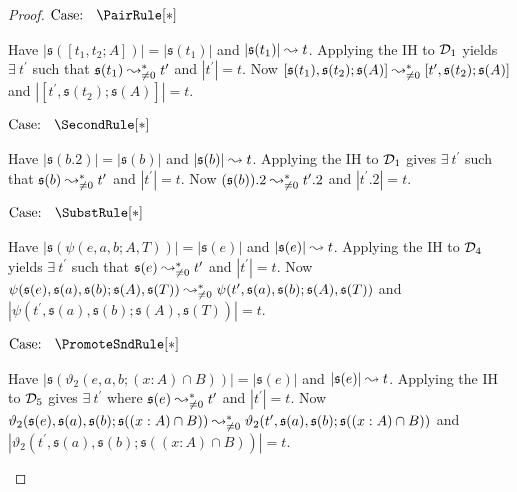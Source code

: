 \begin{proof}
    $\text{Case: }\begin{array}{c} \PairRule[*] \end{array}$
    \begin{proofcase}
        Have $|\mathfrak{s}([t_1, t_2; A])| = |\mathfrak{s}(t_1)|$ and $|\mathfrak{s}(t_1)| \leadsto t$.
        Applying the IH to $\mathcal{D}_{1}$ yields $\exists\ t^\prime$ such that $\mathfrak{s}(t_1) \leadsto^*_{\neq 0} t^\prime$ and $|t^\prime| = t$.
        Now $[\mathfrak{s}(t_1), \mathfrak{s}(t_2); \mathfrak{s}(A)] \leadsto^*_{\neq 0} [t^\prime, \mathfrak{s}(t_2); \mathfrak{s}(A)]$ and $|[t^\prime, \mathfrak{s}(t_2); \mathfrak{s}(A)]| = t$.
    \end{proofcase}

    $\text{Case: }\begin{array}{c} \SecondRule[*] \end{array}$
    \begin{proofcase}
        Have $|\mathfrak{s}(b.2)| = |\mathfrak{s}(b)|$ and $|\mathfrak{s}(b)| \leadsto t$.
        Applying the IH to $\mathcal{D}_{1}$ gives $\exists\ t^\prime$ such that $\mathfrak{s}(b) \leadsto^*_{\neq 0} t^\prime$ and $|t^\prime| = t$.
        Now $(\mathfrak{s}(b)).2 \leadsto^*_{\neq 0} t^\prime.2$ and $|t^\prime.2| = t$.
    \end{proofcase}

    $\text{Case: }\begin{array}{c} \SubstRule[*] \end{array}$
    \begin{proofcase}
        Have $|\mathfrak{s}(\psi(e, a, b; A, T))| = |\mathfrak{s}(e)|$ and $|\mathfrak{s}(e)| \leadsto t$.
        Applying the IH to $\mathcal{D}_{4}$ yields $\exists\ t^\prime$ such that $\mathfrak{s}(e) \leadsto^*_{\neq 0} t^\prime$ and $|t^\prime| = t$.
        Now $\psi(\mathfrak{s}(e), \mathfrak{s}(a), \mathfrak{s}(b); \mathfrak{s}(A), \mathfrak{s}(T)) \leadsto^*_{\neq 0} \psi(t^\prime, \mathfrak{s}(a), \mathfrak{s}(b); \mathfrak{s}(A), \mathfrak{s}(T))$
            and $|\psi(t^\prime, \mathfrak{s}(a), \mathfrak{s}(b); \mathfrak{s}(A), \mathfrak{s}(T))| = t$.
    \end{proofcase}

    $\text{Case: }\begin{array}{c} \PromoteSndRule[*] \end{array}$
    \begin{proofcase}
        Have $|\mathfrak{s}(\vartheta_2(e, a, b; (x : A) \cap B))| = |\mathfrak{s}(e)|$ and $|\mathfrak{s}(e)| \leadsto t$.
        Applying the IH to $\mathcal{D}_{5}$ gives $\exists\ t^\prime$ where $\mathfrak{s}(e) \leadsto^*_{\neq 0} t^\prime$ and $|t^\prime| = t$.
        Now $\vartheta_2(\mathfrak{s}(e), \mathfrak{s}(a), \mathfrak{s}(b); \mathfrak{s}((x : A) \cap B)) \leadsto^*_{\neq 0} \vartheta_2(t^\prime, \mathfrak{s}(a), \mathfrak{s}(b); \mathfrak{s}((x : A) \cap B))$
            and $|\vartheta_2(t^\prime, \mathfrak{s}(a), \mathfrak{s}(b); \mathfrak{s}((x : A) \cap B))| = t$.
    \end{proofcase}


\end{proof}

